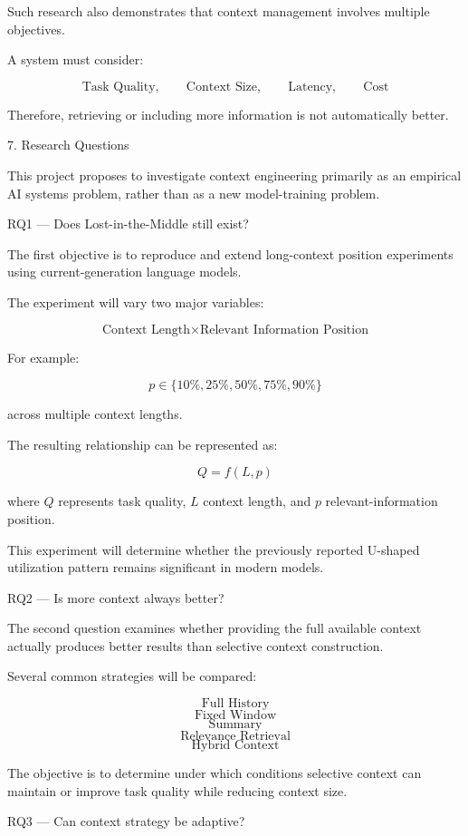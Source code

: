 Such research also demonstrates that context management involves multiple objectives.

A system must consider:

$$ \text{Task Quality}, \qquad \text{Context Size}, \qquad \text{Latency}, \qquad \text{Cost} $$

Therefore, retrieving or including more information is not automatically better.

7. Research Questions

This project proposes to investigate context engineering primarily as an empirical AI systems problem, rather than as a new model-training problem.

RQ1 — Does Lost-in-the-Middle still exist?

The first objective is to reproduce and extend long-context position experiments using current-generation language models.

The experiment will vary two major variables:

$$ \boxed{ \text{Context Length} \times \text{Relevant Information Position} } $$

For example:

$$ p\in \{10\%,25\%,50\%,75\%,90\%\} $$

across multiple context lengths.

The resulting relationship can be represented as:

$$ Q=f(L,p) $$

where \(Q\) represents task quality, \(L\) context length, and \(p\) relevant-information position.

This experiment will determine whether the previously reported U-shaped utilization pattern remains significant in modern models.

RQ2 — Is more context always better?

The second question examines whether providing the full available context actually produces better results than selective context construction.

Several common strategies will be compared:

$$ \text{Full History} $$ $$ \text{Fixed Window} $$ $$ \text{Summary} $$ $$ \text{Relevance Retrieval} $$ $$ \text{Hybrid Context} $$

The objective is to determine under which conditions selective context can maintain or improve task quality while reducing context size.

RQ3 — Can context strategy be adaptive?

